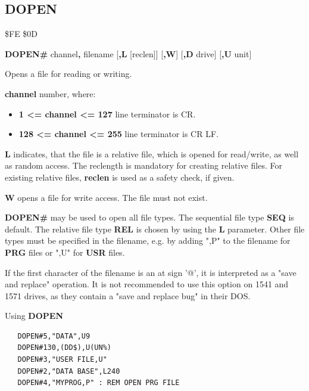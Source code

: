 \subsection{DOPEN}
\begin{description}[leftmargin=2cm,style=nextline]
\item [Token:] \$FE \$0D
\item [Format:] {\bf DOPEN\#} channel{\bf,} filename
		[{\bf,L} [reclen]] [{\bf,W}] [{\bf,D} drive] [{\bf,U} unit]
\item [Usage:]
    Opens a file for reading or writing.

    {\bf channel} number, where:
    \begin{itemize}
        \item {\bf 1 <= channel <= 127} line terminator is CR.
        \item {\bf 128 <= channel <= 255} line terminator is CR LF.
    \end{itemize}

   {\bf L} indicates, that the file is a relative file, which
   is opened for read/write, as well as random access. The reclength
   is mandatory for creating relative files. For existing
   relative files, {\bf reclen} is used as a safety check, if given.

   {\bf W} opens a file for write access. The file must not exist.

   \filenamedefinition

   \drivedefinition

   \unitdefinition

\item [Remarks:]
   {\bf DOPEN\#} may be used to open all file types.
   The sequential file type {\bf SEQ} is default.
   The relative file type {\bf REL} is chosen by using the
   {\bf L} parameter.  Other file types
   must be specified in the filename, e.g. by adding ",P" to the
   filename for {\bf PRG} files or ",U" for {\bf USR} files.

   If the first character of the filename is an at sign '@', it
   is interpreted as a "save and replace" operation. It is not recommended
   to use this option on 1541 and 1571 drives, as they
   contain a "save and replace bug" in their DOS.

\newpage
\item [Examples:] Using {\bf DOPEN}

\begin{tcolorbox}[colback=black,coltext=white]
\verbatimfont{\codefont}
\begin{verbatim}
   DOPEN#5,"DATA",U9
   DOPEN#130,(DD$),U(UN%)
   DOPEN#3,"USER FILE,U"
   DOPEN#2,"DATA BASE",L240
   DOPEN#4,"MYPROG,P" : REM OPEN PRG FILE
\end{verbatim}
\end{tcolorbox}
\end{description}

